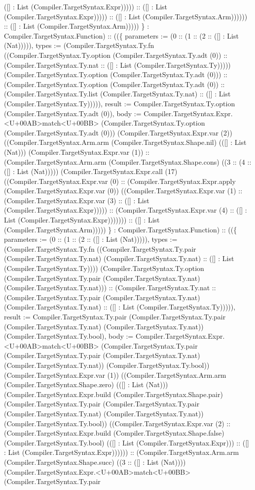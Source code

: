 \documentclass[11pt]{article}
\begin{document}
([] : List (Compiler.TargetSyntax.Expr))))) :: ([] : List (Compiler.TargetSyntax.Expr))))) :: ([] : List (Compiler.TargetSyntax.Arm)))))) :: ([] : List (Compiler.TargetSyntax.Arm))))) \} : Compiler.TargetSyntax.Function) :: ((\{ parameters := (0 :: (1 :: (2 :: ([] : List (Nat))))), types := (Compiler.TargetSyntax.Ty.fn ((Compiler.TargetSyntax.Ty.option (Compiler.TargetSyntax.Ty.adt (0)) :: (Compiler.TargetSyntax.Ty.nat :: ([] : List (Compiler.TargetSyntax.Ty))))) (Compiler.TargetSyntax.Ty.option (Compiler.TargetSyntax.Ty.adt (0))) :: (Compiler.TargetSyntax.Ty.option (Compiler.TargetSyntax.Ty.adt (0)) :: (Compiler.TargetSyntax.Ty.list (Compiler.TargetSyntax.Ty.nat) :: ([] : List (Compiler.TargetSyntax.Ty))))), result := Compiler.TargetSyntax.Ty.option (Compiler.TargetSyntax.Ty.adt (0)), body := Compiler.TargetSyntax.Expr.<U+00AB>match<U+00BB> (Compiler.TargetSyntax.Ty.option (Compiler.TargetSyntax.Ty.adt (0))) (Compiler.TargetSyntax.Expr.var (2)) ((Compiler.TargetSyntax.Arm.arm (Compiler.TargetSyntax.Shape.nil) (([] : List (Nat))) (Compiler.TargetSyntax.Expr.var (1)) :: (Compiler.TargetSyntax.Arm.arm (Compiler.TargetSyntax.Shape.cons) ((3 :: (4 :: ([] : List (Nat))))) (Compiler.TargetSyntax.Expr.call (17) ((Compiler.TargetSyntax.Expr.var (0) :: (Compiler.TargetSyntax.Expr.apply (Compiler.TargetSyntax.Expr.var (0)) ((Compiler.TargetSyntax.Expr.var (1) :: (Compiler.TargetSyntax.Expr.var (3) :: ([] : List (Compiler.TargetSyntax.Expr))))) :: (Compiler.TargetSyntax.Expr.var (4) :: ([] : List (Compiler.TargetSyntax.Expr))))))) :: ([] : List (Compiler.TargetSyntax.Arm))))) \} : Compiler.TargetSyntax.Function) :: ((\{ parameters := (0 :: (1 :: (2 :: ([] : List (Nat))))), types := (Compiler.TargetSyntax.Ty.fn ((Compiler.TargetSyntax.Ty.pair (Compiler.TargetSyntax.Ty.nat) (Compiler.TargetSyntax.Ty.nat) :: ([] : List (Compiler.TargetSyntax.Ty)))) (Compiler.TargetSyntax.Ty.option (Compiler.TargetSyntax.Ty.pair (Compiler.TargetSyntax.Ty.nat) (Compiler.TargetSyntax.Ty.nat))) :: (Compiler.TargetSyntax.Ty.nat :: (Compiler.TargetSyntax.Ty.pair (Compiler.TargetSyntax.Ty.nat) (Compiler.TargetSyntax.Ty.nat) :: ([] : List (Compiler.TargetSyntax.Ty))))), result := Compiler.TargetSyntax.Ty.pair (Compiler.TargetSyntax.Ty.pair (Compiler.TargetSyntax.Ty.nat) (Compiler.TargetSyntax.Ty.nat)) (Compiler.TargetSyntax.Ty.bool), body := Compiler.TargetSyntax.Expr.<U+00AB>match<U+00BB> (Compiler.TargetSyntax.Ty.pair (Compiler.TargetSyntax.Ty.pair (Compiler.TargetSyntax.Ty.nat) (Compiler.TargetSyntax.Ty.nat)) (Compiler.TargetSyntax.Ty.bool)) (Compiler.TargetSyntax.Expr.var (1)) ((Compiler.TargetSyntax.Arm.arm (Compiler.TargetSyntax.Shape.zero) (([] : List (Nat))) (Compiler.TargetSyntax.Expr.build (Compiler.TargetSyntax.Shape.pair) (Compiler.TargetSyntax.Ty.pair (Compiler.TargetSyntax.Ty.pair (Compiler.TargetSyntax.Ty.nat) (Compiler.TargetSyntax.Ty.nat)) (Compiler.TargetSyntax.Ty.bool)) ((Compiler.TargetSyntax.Expr.var (2) :: (Compiler.TargetSyntax.Expr.build (Compiler.TargetSyntax.Shape.false) (Compiler.TargetSyntax.Ty.bool) (([] : List (Compiler.TargetSyntax.Expr))) :: ([] : List (Compiler.TargetSyntax.Expr)))))) :: (Compiler.TargetSyntax.Arm.arm (Compiler.TargetSyntax.Shape.succ) ((3 :: ([] : List (Nat)))) (Compiler.TargetSyntax.Expr.<U+00AB>match<U+00BB> (Compiler.TargetSyntax.Ty.pair 
\end{document}
